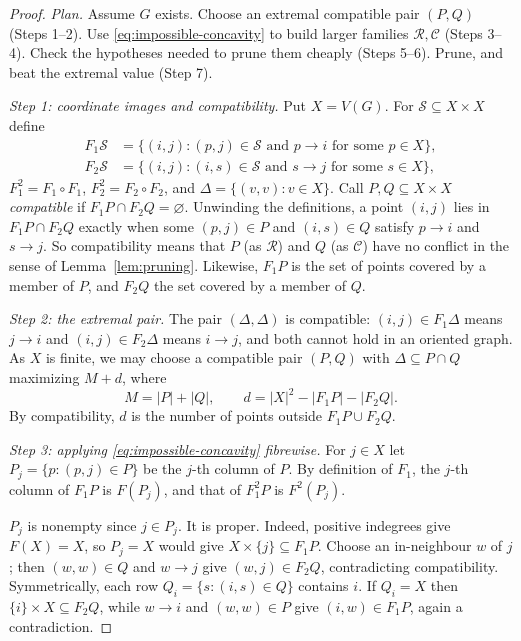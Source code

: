 \documentclass[11pt]{article}
\theoremstyle{remark}
\newcommand{\abs}[1]{\lvert #1\rvert}
\begin{document}
\begin{proof}
\emph{Plan.}  Assume $G$ exists.  Choose an extremal compatible pair $(P,Q)$
(Steps 1--2).  Use \eqref{eq:impossible-concavity} to build larger families
$\mathcal R,\mathcal C$ (Steps 3--4).  Check the hypotheses needed to prune
them cheaply (Steps 5--6).  Prune, and beat the extremal value (Step 7).

\smallskip\noindent\emph{Step 1: coordinate images and compatibility.}
Put $X=V(G)$.  For $\mathcal S\subseteq X\times X$ define
\[
 \begin{aligned}
 F_1\mathcal S&=\{(i,j): (p,j)\in\mathcal S\text{ and }p\to i
                     \text{ for some }p\in X\},\\
 F_2\mathcal S&=\{(i,j): (i,s)\in\mathcal S\text{ and }s\to j
                     \text{ for some }s\in X\},
 \end{aligned}
\]
$F_1^2=F_1\circ F_1$, $F_2^2=F_2\circ F_2$, and
$\Delta=\{(v,v):v\in X\}$.  Call $P,Q\subseteq X\times X$ \emph{compatible}
if $F_1P\cap F_2Q=\varnothing$.  Unwinding the definitions, a point $(i,j)$
lies in $F_1P\cap F_2Q$ exactly when some $(p,j)\in P$ and $(i,s)\in Q$
satisfy $p\to i$ and $s\to j$.  So compatibility means that $P$ (as
$\mathcal R$) and $Q$ (as $\mathcal C$) have no conflict in the sense of
Lemma~\ref{lem:pruning}.  Likewise, $F_1P$ is the set of points covered by
a member of $P$, and $F_2Q$ the set covered by a member of $Q$.

\smallskip\noindent\emph{Step 2: the extremal pair.}
The pair $(\Delta,\Delta)$ is compatible: $(i,j)\in F_1\Delta$ means
$j\to i$ and $(i,j)\in F_2\Delta$ means $i\to j$, and both cannot hold in an
oriented graph.  As $X$ is finite, we may choose a compatible pair $(P,Q)$
with $\Delta\subseteq P\cap Q$ maximizing $M+d$, where
\[
 M=\abs{P}+\abs{Q},\qquad
 d=\abs{X}^2-\abs{F_1P}-\abs{F_2Q}.
\]
By compatibility, $d$ is the number of points outside $F_1P\cup F_2Q$.

\smallskip\noindent\emph{Step 3: applying \eqref{eq:impossible-concavity}
fibrewise.}
For $j\in X$ let $P_j=\{p:(p,j)\in P\}$ be the $j$-th column of $P$.  By
definition of $F_1$, the $j$-th column of $F_1P$ is $F(P_j)$, and that of
$F_1^2P$ is $F^2(P_j)$.

$P_j$ is nonempty since $j\in P_j$.  It is proper.  Indeed, positive
indegrees give $F(X)=X$, so $P_j=X$ would give
$X\times\{j\}\subseteq F_1P$.  Choose an in-neighbour $w$ of $j$; then
$(w,w)\in Q$ and $w\to j$ give $(w,j)\in F_2Q$, contradicting
compatibility.  Symmetrically, each row $Q_i=\{s:(i,s)\in Q\}$ contains
$i$.  If $Q_i=X$ then $\{i\}\times X\subseteq F_2Q$, while $w\to i$ and
$(w,w)\in P$ give $(i,w)\in F_1P$, again a contradiction.


\end{proof}
\end{document}
